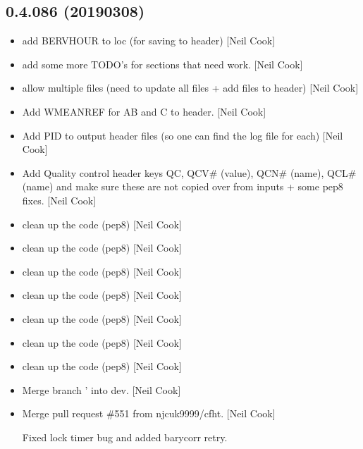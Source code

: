 \documentclass[a4paper,10pt,english]{report}
\begin{document}
\subsection{0.4.086 (2019\sphinxhyphen{}03\sphinxhyphen{}08)}
\label{\detokenize{misc/changelog:id193}}\begin{itemize}
\item {} 
 \sphinxhyphen{} add BERVHOUR to loc (for saving to header) {[}Neil Cook{]}

\item {} 
 \sphinxhyphen{} add some more TODO’s for sections that
need work. {[}Neil Cook{]}

\item {} 
 \sphinxhyphen{} allow multiple files (need to update all files + add files to
header) {[}Neil Cook{]}

\item {} 
Add WMEANREF for AB and C to header. {[}Neil Cook{]}

\item {} 
Add PID to output header files (so one can find the log file for each)
{[}Neil Cook{]}

\item {} 
Add Quality control header keys QC, QCV\# (value), QCN\# (name), QCL\#
(name) \sphinxhyphen{} and make sure these are not copied over from inputs + some
pep8 fixes. {[}Neil Cook{]}

\item {} 
 \sphinxhyphen{} clean up the code (pep8) {[}Neil Cook{]}

\item {} 
 \sphinxhyphen{} clean up the code (pep8) {[}Neil Cook{]}

\item {} 
 \sphinxhyphen{} clean up the code (pep8) {[}Neil Cook{]}

\item {} 
 \sphinxhyphen{} clean up the code (pep8) {[}Neil Cook{]}

\item {} 
 \sphinxhyphen{} clean up the code (pep8) {[}Neil Cook{]}

\item {} 
 \sphinxhyphen{} clean up the code (pep8) {[}Neil Cook{]}

\item {} 
 \sphinxhyphen{} clean up the code (pep8) {[}Neil Cook{]}

\item {} 
Merge branch ’ into dev. {[}Neil Cook{]}

\item {} 
Merge pull request \#551 from njcuk9999/cfht. {[}Neil Cook{]}

Fixed lock timer bug and added barycorr retry.

\end{itemize}
\end{document}
